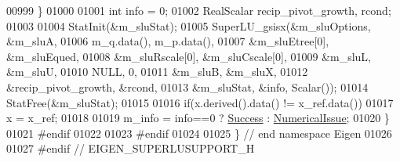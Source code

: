 \begin{DoxyCode}
00999   \}
01000   
01001   \textcolor{keywordtype}{int} info = 0;
01002   RealScalar recip\_pivot\_growth, rcond;
01003 
01004   StatInit(&m\_sluStat);
01005   SuperLU\_gsisx(&m\_sluOptions, &m\_sluA,
01006                 m\_q.data(), m\_p.data(),
01007                 &m\_sluEtree[0], &m\_sluEqued,
01008                 &m\_sluRscale[0], &m\_sluCscale[0],
01009                 &m\_sluL, &m\_sluU,
01010                 NULL, 0,
01011                 &m\_sluB, &m\_sluX,
01012                 &recip\_pivot\_growth, &rcond,
01013                 &m\_sluStat, &info, Scalar());
01014   StatFree(&m\_sluStat);
01015   
01016   \textcolor{keywordflow}{if}(x.derived().data() != x\_ref.data())
01017     x = x\_ref;
01018 
01019   m\_info = info==0 ? \hyperlink{group__enums_gga85fad7b87587764e5cf6b513a9e0ee5ea52581b035f4b59c203b8ff999ef5fcea}{Success} : \hyperlink{group__enums_gga85fad7b87587764e5cf6b513a9e0ee5eaaf9b736d310a664e7729d163a035cc5f}{NumericalIssue};
01020 \}
01021 \textcolor{preprocessor}{#endif}
01022 
01023 \textcolor{preprocessor}{#endif}
01024 
01025 \} \textcolor{comment}{// end namespace Eigen}
01026 
01027 \textcolor{preprocessor}{#endif // EIGEN\_SUPERLUSUPPORT\_H}
\end{DoxyCode}
